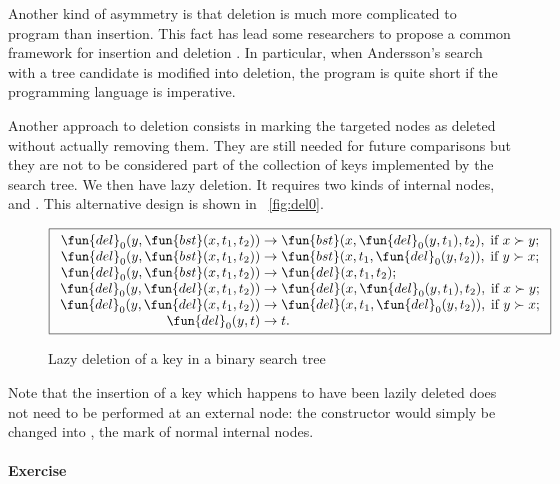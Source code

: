 Another kind of asymmetry is that deletion is much more complicated to
program than insertion. This fact has lead some researchers to propose
a common framework for insertion and deletion
\citep{Andersson_1991,Hinze_2002}. In particular, when Andersson's
search with a tree candidate is modified into deletion, the program is
quite short if the programming language is imperative.

Another approach to deletion consists in marking the targeted nodes as
deleted without actually removing them. They are still needed for
future comparisons but they are not to be considered part of the
collection of keys implemented by the search tree. We then have lazy
deletion. It requires two kinds of internal nodes,  and
. This alternative design is shown
in \fig~\vref{fig:del0}.
\begin{figure}[!t]
\begin{equation*}
\boxed{
\begin{array}{r@{\;}l@{\;}l}
  \fun{del}_0(y,\fun{bst}(x,t_1,t_2)) & \rightarrow &
  \fun{bst}(x,\fun{del}_0(y,t_1),t_2),\; \text{if \(x \succ y\)};\\
\fun{del}_0(y,\fun{bst}(x,t_1,t_2)) & \rightarrow &
  \fun{bst}(x,t_1,\fun{del}_0(y,t_2)),\; \text{if \(y \succ x\)};\\
\fun{del}_0(y,\fun{bst}(x,t_1,t_2)) & \rightarrow &
  \fun{del}(x,t_1,t_2);\\
\fun{del}_0(y,\fun{del}(x,t_1,t_2)) & \rightarrow &
  \fun{del}(x,\fun{del}_0(y,t_1),t_2),\; \text{if \(x \succ y\)};\\
\fun{del}_0(y,\fun{del}(x,t_1,t_2)) & \rightarrow &
  \fun{del}(x,t_1,\fun{del}_0(y,t_2)),\; \text{if \(y \succ x\)};\\
\fun{del}_0(y,t) & \rightarrow & t.\\
\end{array}}
\end{equation*}
\caption{Lazy deletion of a key in a binary search tree}
\label{fig:del0}
\end{figure}
Note that the insertion of a key which happens to have been lazily
deleted does not need to be performed at an external node: the
constructor  would simply be changed into , the
mark of normal internal nodes.

\paragraph{Exercise}

